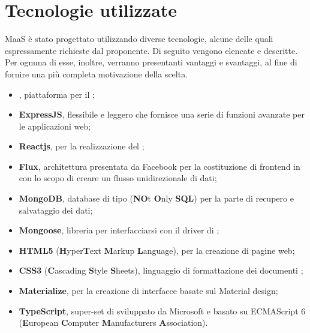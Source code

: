 \section{Tecnologie utilizzate}
MaaS \`e stato progettato utilizzando diverse tecnologie, alcune delle quali espressamente richieste dal proponente. Di seguito vengono elencate e descritte. Per ognuna di esse, inoltre, verranno presentanti vantaggi e svantaggi, al fine di fornire una pi\`u completa motivazione della scelta.
\begin{itemize}
\item \textbf{}, piattaforma per il ;
\item \textbf{ExpressJS},   flessibile e leggero che fornisce una serie di funzioni avanzate per le applicazioni web;
\item \textbf{Reactjs},   per la realizzazione del ;
\item \textbf{Flux}, architettura presentata da Facebook per la costituzione di frontend in  con lo scopo di creare un flusso unidirezionale di dati;
\item \textbf{MongoDB}, database di tipo  (\textbf{NO}t \textbf{O}nly \textbf{SQL}) per la parte di recupero e salvataggio dei dati;
\item \textbf{Mongoose}, libreria per interfacciarsi con il driver di ;
\item \textbf{HTML5} (\textbf{H}yper\textbf{T}ext \textbf{M}arkup \textbf{L}anguage),  per la creazione di pagine web;
\item \textbf{CSS3} (\textbf{C}ascading \textbf{S}tyle \textbf{S}heets), linguaggio di formattazione dei documenti ;
\item \textbf{Materialize},   per la creazione di interfacce basate sul Material design;
\item \textbf{TypeScript}, super-set di  sviluppato da Microsoft e basato su ECMAScript 6 (\textbf{E}uropean \textbf{C}omputer \textbf{M}anufacturers \textbf{A}ssociation).
\end{itemize}


